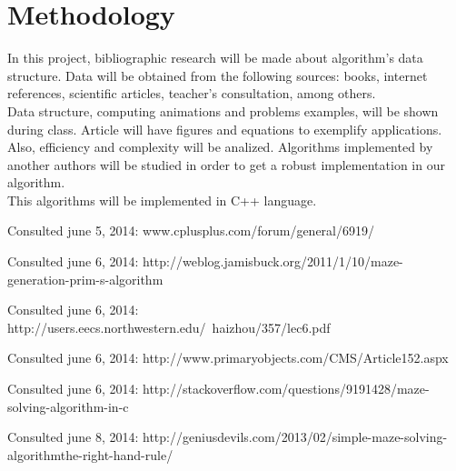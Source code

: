 \documentclass[letterpaper]{article}
\begin{document}
\section{Methodology}

In this project, bibliographic research will be made about algorithm's data structure. Data will be obtained from the following sources: books, internet references, scientific articles, teacher's consultation, among others.\\

Data structure, computing animations and problems examples, will be shown during class. Article will have figures and equations to exemplify applications. Also, efficiency and complexity will be analized. Algorithms implemented by another authors will be studied in order to get a robust implementation in our algorithm.\\

This algorithms will be implemented in C++ language.



\begin{thebibliography}{99}

Consulted  june 5, 2014: www.cplusplus.com/forum/general/6919/

Consulted  june 6, 2014: http://weblog.jamisbuck.org/2011/1/10/maze-generation-prim-s-algorithm

Consulted  june 6, 2014: http://users.eecs.northwestern.edu/~haizhou/357/lec6.pdf

Consulted  june 6, 2014: http://www.primaryobjects.com/CMS/Article152.aspx

Consulted  june 6, 2014: http://stackoverflow.com/questions/9191428/maze-solving-algorithm-in-c

Consulted  june 8, 2014: http://geniusdevils.com/2013/02/simple-maze-solving-algorithmthe-right-hand-rule/


\end{thebibliography}
\end{document}
